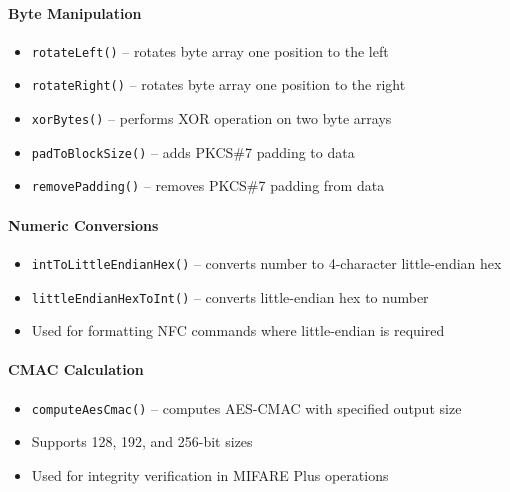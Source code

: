 \documentclass[a4paper,12pt]{article}
\begin{document}
\paragraph{Byte Manipulation}
\begin{itemize}
    \item \texttt{rotateLeft()} -- rotates byte array one position to the left
    \item \texttt{rotateRight()} -- rotates byte array one position to the right
    \item \texttt{xorBytes()} -- performs XOR operation on two byte arrays
    \item \texttt{padToBlockSize()} -- adds PKCS\#7 padding to data
    \item \texttt{removePadding()} -- removes PKCS\#7 padding from data
\end{itemize}

\paragraph{Numeric Conversions}
\begin{itemize}
    \item \texttt{intToLittleEndianHex()} -- converts number to 4-character little-endian hex
    \item \texttt{littleEndianHexToInt()} -- converts little-endian hex to number
    \item Used for formatting NFC commands where little-endian is required
\end{itemize}

\paragraph{CMAC Calculation}
\begin{itemize}
    \item \texttt{computeAesCmac()} -- computes AES-CMAC with specified output size
    \item Supports 128, 192, and 256-bit sizes
    \item Used for integrity verification in MIFARE Plus operations
\end{itemize}
\end{document}
